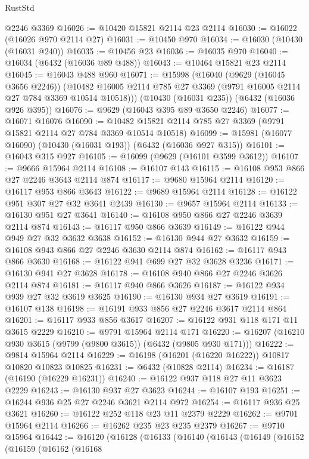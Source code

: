 \begin{lexlean}{RustStd}
\begin{coremodule}
    @2246
    @3369
@16026 := @10420 @15821 @2114 @23 @2114
@16030 := @16022 (@16026 @970 @2114 @27)
@16031 := @10450 @970
@16034 := @16030 (@10430 (@16031 @240))
@16035 := @10456 @23
@16036 := @16035 @970
@16040 := @16034 (@6432 (@16036 @89 @488))
@16043 := @10464 @15821 @23 @2114
@16045 := @16043 @488 @960
@16071 := @15998
    (@16040
      (@9629 (@16045 @3656 @2246))
      (@10482 @16005 @2114 @785 @27 @3369 (@9791 @16005 @2114 @27 @784 @3369 @10514 @10518)))
    (@10430 (@16031 @235))
    (@6432 (@16036 @926 @395))
@16076 := @9629 (@16043 @395 @89 @3650 @2246)
@16077 := @16071 @16076
@16090 := @10482 @15821 @2114 @785 @27 @3369 (@9791 @15821 @2114 @27 @784 @3369 @10514 @10518)
@16099 := @15981 (@16077 @16090) (@10430 (@16031 @193)) (@6432 (@16036 @927 @315))
@16101 := @16043 @315 @927
@16105 := @16099 (@9629 (@16101 @3599 @3612))
@16107 := @9666 @15964 @2114
@16108 := @16107 @143
@16115 := @16108 @953 @866 @27 @2246 @3643 @2114 @874
@16117 := @9680 @15964 @2114
@16120 := @16117 @953 @866 @3643
@16122 := @9689 @15964 @2114
@16128 := @16122 @951 @307 @27 @32 @3641 @2439
@16130 := @9657 @15964 @2114
@16133 := @16130 @951 @27 @3641
@16140 := @16108 @950 @866 @27 @2246 @3639 @2114 @874
@16143 := @16117 @950 @866 @3639
@16149 := @16122 @944 @949 @27 @32 @3632 @3638
@16152 := @16130 @944 @27 @3632
@16159 := @16108 @943 @866 @27 @2246 @3630 @2114 @874
@16162 := @16117 @943 @866 @3630
@16168 := @16122 @941 @699 @27 @32 @3628 @3236
@16171 := @16130 @941 @27 @3628
@16178 := @16108 @940 @866 @27 @2246 @3626 @2114 @874
@16181 := @16117 @940 @866 @3626
@16187 := @16122 @934 @939 @27 @32 @3619 @3625
@16190 := @16130 @934 @27 @3619
@16191 := @16107 @138
@16198 := @16191 @933 @856 @27 @2246 @3617 @2114 @864
@16201 := @16117 @933 @856 @3617
@16207 := @16122 @931 @118 @171 @11 @3615 @2229
@16210 := @9791 @15964 @2114 @171
@16220 := @16207 (@16210 @930 @3615 (@9799 (@9800 @3615)) (@6432 (@9805 @930 @171)))
@16222 := @9814 @15964 @2114
@16229 := @16198 (@16201 (@16220 @16222)) @10817 @10820 @10823 @10825
@16231 := @6432 (@10828 @2114)
@16234 := @16187 (@16190 (@16229 @16231))
@16240 := @16122 @937 @118 @27 @11 @3623 @2229
@16243 := @16130 @937 @27 @3623
@16244 := @16107 @193
@16251 := @16244 @936 @25 @27 @2246 @3621 @2114 @972
@16254 := @16117 @936 @25 @3621
@16260 := @16122 @252 @118 @23 @11 @2379 @2229
@16262 := @9701 @15964 @2114
@16266 := @16262 @235 @23 @235 @2379
@16267 := @9710 @15964
@16442 := @16120
    (@16128
      (@16133
        (@16140
          (@16143
            (@16149
              (@16152
                (@16159
                  (@16162
                    (@16168

\end{coremodule}
\end{lexlean}
